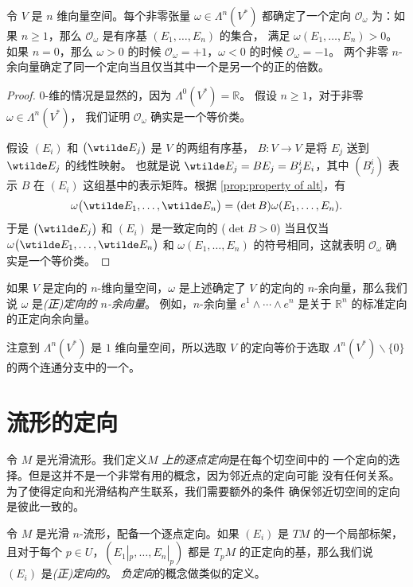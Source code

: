 \begin{proposition}
  令 $V$ 是 $n$ 维向量空间。每个非零张量 $\omega\in\Lambda^n(V^*)$
  都确定了一个定向 $\mathcal{O}_\omega$ 为：如果 $n\ge 1$，那么 
  $\mathcal{O}_\omega$ 是有序基 $(E_1,\dots,E_n)$ 的集合，
  满足 $\omega(E_1,\dots,E_n)>0$。如果 $n=0$，那么 $\omega>0$
  的时候 $\mathcal{O}_\omega=+1$，$\omega<0$ 的时候 $\mathcal{O}_\omega=-1$。
  两个非零 $n$-余向量确定了同一个定向当且仅当其中一个是另一个的正的倍数。 
\end{proposition}
\begin{proof}
  $0$-维的情况是显然的，因为 $\Lambda^0(V^*)=\mathbb{R}$。
  假设 $n\ge 1$，对于非零 $\omega\in \Lambda^n(V^*)$，
  我们证明 $\mathcal{O}_\omega$ 确实是一个等价类。

  假设 $(E_i)$ 和 $\bigl(\wtilde E_j\bigr)$ 是 $V$ 的两组有序基，
  $B:V\to V$ 是将 $E_j$ 送到 $\wtilde E_j$ 的线性映射。
  也就是说 $\wtilde E_j=BE_j=B^i_jE_i$，其中 $(B^i_j)$ 表示 $B$
  在 $(E_i)$ 这组基中的表示矩阵。根据
  \autoref{prop:property of alt}，有
  \[
    \omega\bigl(\wtilde E_1,\dots,\wtilde E_n\bigr)  =
    (\det B)\omega(E_1,\dots,E_n).
  \]
  于是 $\bigl(\wtilde E_j\bigr)$ 和 $(E_i)$ 是一致定向的 ($\det B>0$) 当且仅当
  $\omega\bigl(\wtilde E_1,\dots,\wtilde E_n\bigr)$ 和 $\omega(E_1,\dots,E_n)$
  的符号相同，这就表明 $\mathcal{O}_\omega$ 确实是一个等价类。
\end{proof}

如果 $V$ 是定向的 $n$-维向量空间，$\omega$ 是上述确定了 $V$ 的定向的
$n$-余向量，那么我们说 $\omega$ 是\emph{(正)定向的 $n$-余向量}。
例如，$n$-余向量 $e^1\wedge\cdots\wedge e^n$ 是关于 $\mathbb{R}^n$
的标准定向的正定向余向量。

注意到 $\Lambda^n(V^*)$ 是 $1$ 维向量空间，所以选取 $V$ 的定向等价于选取
$\Lambda^n(V^*) \smallsetminus\{0\}$ 的两个连通分支中的一个。

\section{流形的定向}

令 $M$ 是光滑流形。我们定义\emph{$M$ 上的逐点定向}是在每个切空间中的
一个定向的选择。但是这并不是一个非常有用的概念，因为邻近点的定向可能
没有任何关系。为了使得定向和光滑结构产生联系，我们需要额外的条件
确保邻近切空间的定向是彼此一致的。

令 $M$ 是光滑 $n$-流形，配备一个逐点定向。如果 $(E_i)$ 是 $TM$
的一个局部标架，且对于每个 $p\in U$，$(E_1|_p,\dots,E_n|_p)$
都是 $T_pM$ 的正定向的基，那么我们说 $(E_i)$ 是\emph{(正)定向的}。
\emph{负定向}的概念做类似的定义。
 
